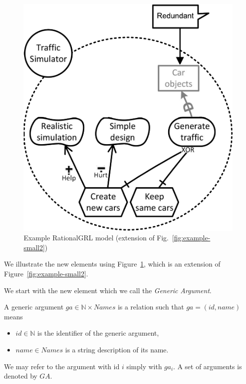 \begin{figure}[ht]
\centering
\includegraphics[width=\columnwidth]{img/Example1-new-attack.pdf}
\caption{Example RationalGRL model (extension of Fig.~\ref{fig:example-small2})}
\label{fig:example-small3}
\end{figure} 

We illustrate the new elements using Figure~\ref{fig:example-small3}, which is an extension of Figure~\ref{fig:example-small2}.

We start with the new element which we call the \emph{Generic Argument}.

\begin{definition}
\label{def:generic-argument}
A generic argument $ga \in \mathbb{N}\times Names$ is a relation such that $ga=(id, name)$ means
\begin{itemize}
\item $id\in \mathbb{N}$ is the identifier of the generic argument,
\item $name\in Names$ is a string description of its name.
\end{itemize}
We may refer to the argument with id $i$ simply with $ga_i$. A set of arguments is denoted by $GA$.
\end{definition}

